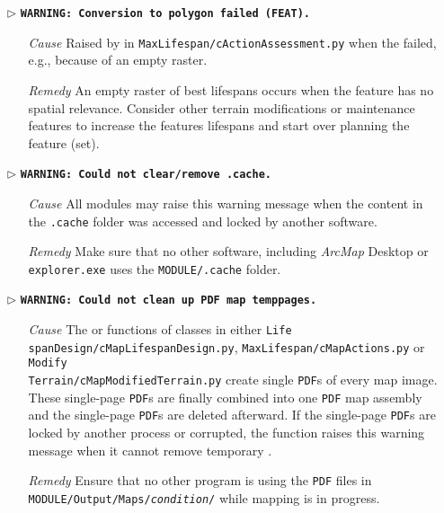\begin{itemize}
	\item[$\triangleright$]\textbf{\texttt{WARNING: Conversion to polygon failed (FEAT).}}
	\begin{itemize}
		\item[\textit{Cause}\hspace{0.27cm}] Raised by  in \texttt{MaxLifespan/cActionAssessment.py} when the  failed, e.g., because of an empty  raster.
		\item[\textit{Remedy}] An empty  raster of best lifespans occurs when the feature has no spatial relevance. Consider other terrain modifications or maintenance features to increase the features lifespans and start over planning the feature (set).\\
	\end{itemize}
	
	\item[$\triangleright$] \textbf{\texttt{WARNING: Could not clear/remove .cache.}}
	\begin{itemize}
		\item[\textit{Cause}\hspace{0.27cm}] All modules may raise this warning message when the content in the \texttt{.cache} folder was accessed and locked by another software.
		\item[\textit{Remedy}] Make sure that no other software, including \textit{ArcMap} Desktop or \texttt{explorer.exe} uses the \texttt{MODULE/.cache} folder.\\
	\end{itemize}
	
	\item[$\triangleright$]\textbf{\texttt{WARNING: Could not clean up PDF map temp{\myUnderscore}pages.}}
	\begin{itemize}
		\item[\textit{Cause}\hspace{0.27cm}] The  or  functions of  classes in either \texttt{Life spanDesign/cMapLifespanDesign.py}, \texttt{MaxLifespan/cMapActions.py} or \texttt{Modify}\\\texttt{Terrain/cMapModifiedTerrain.py} create single \texttt{PDF}s of every map image. These single-page \texttt{PDF}s are finally combined into one \texttt{PDF} map assembly and the single-page \texttt{PDF}s are deleted afterward. If the single-page \texttt{PDF}s are locked by another process or corrupted, the  function raises this warning message when it cannot remove temporary .
		\item[\textit{Remedy}] Ensure that no other program is using the \texttt{PDF} files in \texttt{MODULE/Output/Maps/\textit{condition}/} while mapping is in progress.\\
	\end{itemize}
	

\end{itemize}
